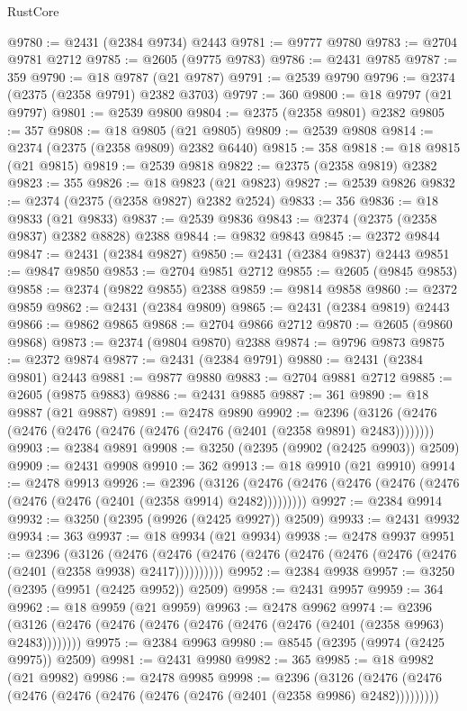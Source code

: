 \begin{lexlean}{RustCore}
\begin{coremodule}
@9780 := @2431 (@2384 @9734) @2443
@9781 := @9777 @9780
@9783 := @2704 @9781 @2712
@9785 := @2605 (@9775 @9783)
@9786 := @2431 @9785
@9787 := 359
@9790 := @18 @9787 (@21 @9787)
@9791 := @2539 @9790
@9796 := @2374 (@2375 (@2358 @9791) @2382 @3703)
@9797 := 360
@9800 := @18 @9797 (@21 @9797)
@9801 := @2539 @9800
@9804 := @2375 (@2358 @9801) @2382
@9805 := 357
@9808 := @18 @9805 (@21 @9805)
@9809 := @2539 @9808
@9814 := @2374 (@2375 (@2358 @9809) @2382 @6440)
@9815 := 358
@9818 := @18 @9815 (@21 @9815)
@9819 := @2539 @9818
@9822 := @2375 (@2358 @9819) @2382
@9823 := 355
@9826 := @18 @9823 (@21 @9823)
@9827 := @2539 @9826
@9832 := @2374 (@2375 (@2358 @9827) @2382 @2524)
@9833 := 356
@9836 := @18 @9833 (@21 @9833)
@9837 := @2539 @9836
@9843 := @2374 (@2375 (@2358 @9837) @2382 @8828) @2388
@9844 := @9832 @9843
@9845 := @2372 @9844
@9847 := @2431 (@2384 @9827)
@9850 := @2431 (@2384 @9837) @2443
@9851 := @9847 @9850
@9853 := @2704 @9851 @2712
@9855 := @2605 (@9845 @9853)
@9858 := @2374 (@9822 @9855) @2388
@9859 := @9814 @9858
@9860 := @2372 @9859
@9862 := @2431 (@2384 @9809)
@9865 := @2431 (@2384 @9819) @2443
@9866 := @9862 @9865
@9868 := @2704 @9866 @2712
@9870 := @2605 (@9860 @9868)
@9873 := @2374 (@9804 @9870) @2388
@9874 := @9796 @9873
@9875 := @2372 @9874
@9877 := @2431 (@2384 @9791)
@9880 := @2431 (@2384 @9801) @2443
@9881 := @9877 @9880
@9883 := @2704 @9881 @2712
@9885 := @2605 (@9875 @9883)
@9886 := @2431 @9885
@9887 := 361
@9890 := @18 @9887 (@21 @9887)
@9891 := @2478 @9890
@9902 := @2396 (@3126 (@2476 (@2476 (@2476 (@2476 (@2476 (@2476 (@2401 (@2358 @9891) @2483))))))))
@9903 := @2384 @9891
@9908 := @3250 (@2395 (@9902 (@2425 @9903)) @2509)
@9909 := @2431 @9908
@9910 := 362
@9913 := @18 @9910 (@21 @9910)
@9914 := @2478 @9913
@9926 := @2396
    (@3126 (@2476 (@2476 (@2476 (@2476 (@2476 (@2476 (@2476 (@2401 (@2358 @9914) @2482)))))))))
@9927 := @2384 @9914
@9932 := @3250 (@2395 (@9926 (@2425 @9927)) @2509)
@9933 := @2431 @9932
@9934 := 363
@9937 := @18 @9934 (@21 @9934)
@9938 := @2478 @9937
@9951 := @2396
    (@3126
      (@2476 (@2476 (@2476 (@2476 (@2476 (@2476 (@2476 (@2476 (@2401 (@2358 @9938) @2417))))))))))
@9952 := @2384 @9938
@9957 := @3250 (@2395 (@9951 (@2425 @9952)) @2509)
@9958 := @2431 @9957
@9959 := 364
@9962 := @18 @9959 (@21 @9959)
@9963 := @2478 @9962
@9974 := @2396 (@3126 (@2476 (@2476 (@2476 (@2476 (@2476 (@2476 (@2401 (@2358 @9963) @2483))))))))
@9975 := @2384 @9963
@9980 := @8545 (@2395 (@9974 (@2425 @9975)) @2509)
@9981 := @2431 @9980
@9982 := 365
@9985 := @18 @9982 (@21 @9982)
@9986 := @2478 @9985
@9998 := @2396
    (@3126 (@2476 (@2476 (@2476 (@2476 (@2476 (@2476 (@2476 (@2401 (@2358 @9986) @2482)))))))))

\end{coremodule}
\end{lexlean}
